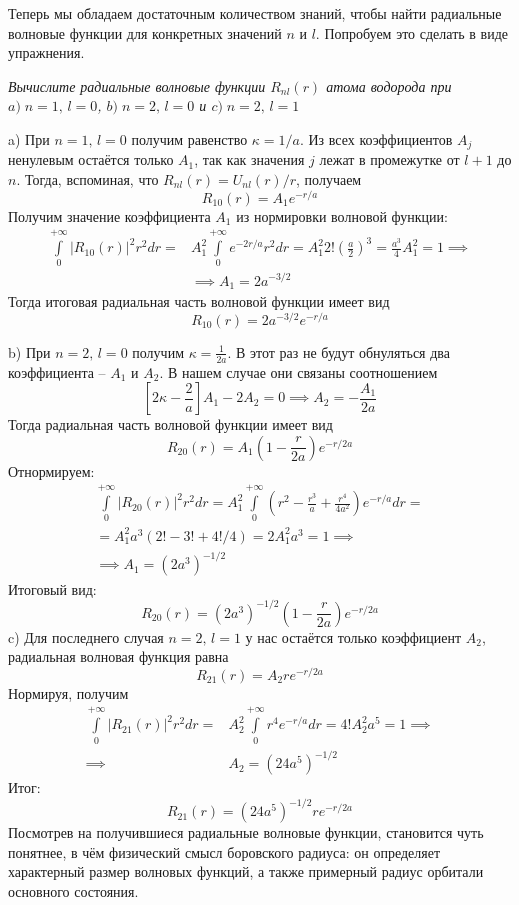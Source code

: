 Теперь мы обладаем достаточным количеством знаний, чтобы найти радиальные волновые функции для конкретных значений $n$ и $l$. Попробуем это сделать в виде упражнения.
\newpage
{}
\begin{center}
    \textit{Вычислите радиальные волновые функции $R_{nl}(r)$ атома водорода при $ a)\;n = 1,\, l =0$, $b)\;n = 2,\, l =0$ и $c)\;n = 2,\, l =1$}
\end{center}

a)  При $n = 1,\, l=0$ получим равенство $\kappa = 1/a$. Из всех коэффициентов $A_j$ ненулевым остаётся только $A_1$, так как значения $j$ лежат в промежутке от $l+1$ до $n$. Тогда, вспоминая, что $R_{nl}(r) = U_{nl}(r)/r$, получаем
\[
R_{10}(r) = A_1e^{-r/a}
\]
Получим значение коэффициента $A_1$ из нормировки волновой функции:
\begin{align*}
\int\limits_0^{+\infty}|R_{10}(r)|^2 r^2 dr = & A^2_1\int\limits_0^{+\infty}e^{-2r/a}r^2 dr = A^2_1 2!\left(\frac{a}{2}\right)^3 = \frac{a^3}{4}A^2_1 = 1 \implies \\ 
&\implies A_1 = 2a^{-3/2}
\end{align*}
Тогда итоговая радиальная часть волновой функции имеет вид
\[
R_{10}(r) = 2a^{-3/2}e^{-r/a}
\]

b) При $n = 2,\, l=0$ получим $\kappa = \frac{1}{2a}$. В этот раз не будут обнуляться два коэффициента -- $A_1$ и $A_2$. В нашем случае они связаны соотношением
\[
\left[ 2\kappa - \frac{2}{a} \right]A_1 - 2A_2 = 0 \implies A_2 = -\frac{A_1}{2a}
\]
Тогда радиальная часть волновой функции имеет вид
\[
R_{20}(r) = A_1\left( 1 - \frac{r}{2a} \right) e^{-r/2a}
\]
Отнормируем:
\begin{gather*}
\int\limits_0^{+\infty}|R_{20}(r)|^2 r^2 dr = A^2_1\int\limits_0^{+\infty}\left( r^2 - \frac{r^3}{a} +\frac{r^4}{4a^2} \right)e^{-r/a} dr = \\ 
= A^2_1 a^3 (2! - 3! + 4!/4) = 2A^2_1 a^3 = 1 \implies \\ 
\implies A_1 = (2a^3)^{-1/2}
\end{gather*}
Итоговый вид:
\[
R_{20}(r) = (2a^3)^{-1/2}\left( 1 - \frac{r}{2a} \right) e^{-r/2a}
\]
c) Для последнего случая $n=2,\, l=1$ у нас остаётся только коэффициент $A_2$, радиальная волновая функция равна
\[
R_{21}(r) = A_2re^{-r/2a}
\]
Нормируя, получим
\begin{align*}    
\int\limits_0^{+\infty}|R_{21}(r)|^2 r^2 dr = & A^2_2\int\limits_0^{+\infty}r^4 e^{-r/a} dr = 4! A^2_2 a^5 = 1 \implies \\ \implies & A_2 = (24a^5)^{-1/2}
\end{align*}
Итог:
\[
R_{21}(r) = (24a^5)^{-1/2}re^{-r/2a}
\]
Посмотрев на получившиеся радиальные волновые функции, становится чуть понятнее, в чём физический смысл боровского радиуса: он определяет характерный размер волновых функций, а также примерный радиус орбитали основного состояния.

